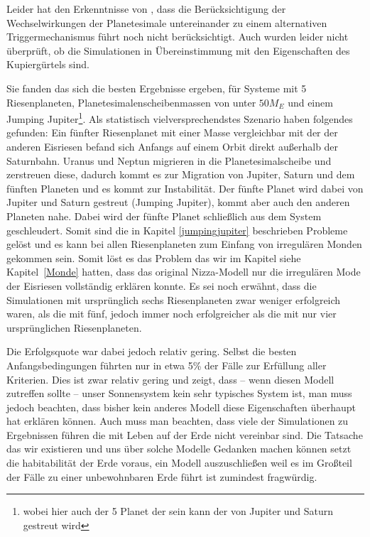 \documentclass[12pt,a4paper,twoside]{article}
\newcommand{\refsec}[1]{siehe Kapitel~\ref{#1}}
\begin{document}
Leider hat \cite{Nesvorny2012} den Erkenntnisse von \cite{Levison2011}, dass die Berücksichtigung der Wechselwirkungen der Planetesimale untereinander zu einem alternativen Triggermechanismus führt noch nicht berücksichtigt. Auch wurden leider nicht überprüft, ob die Simulationen in Übereinstimmung mit den Eigenschaften des Kupiergürtels sind.

Sie fanden das sich die besten Ergebnisse ergeben, für Systeme mit 5 Riesenplaneten, Planetesimalenscheibenmassen von unter $50M_E$ und einem Jumping Jupiter\footnote{wobei hier auch der 5 Planet der sein kann der von Jupiter und Saturn gestreut wird}.
Als statistisch vielversprechendstes Szenario haben \cite{Nesvorny2012} folgendes gefunden:
Ein fünfter Riesenplanet mit einer Masse vergleichbar mit der der anderen Eisriesen befand sich Anfangs auf einem Orbit direkt außerhalb der Saturnbahn.
Uranus und Neptun migrieren in die Planetesimalscheibe und zerstreuen diese, dadurch kommt es zur Migration von Jupiter, Saturn und dem fünften Planeten und es kommt zur Instabilität. Der fünfte Planet wird dabei von Jupiter und Saturn gestreut (Jumping Jupiter), kommt aber auch den anderen Planeten nahe. Dabei wird der fünfte Planet schließlich aus dem System geschleudert. %
Somit sind die in Kapitel \ref{jumpingjupiter} beschrieben Probleme gelöst und es kann bei allen Riesenplaneten zum Einfang von irregulären Monden gekommen sein. Somit löst es das Problem das wir im Kapitel \refsec{Monde} hatten, dass das original Nizza-Modell nur die irregulären Mode der Eisriesen vollständig erklären konnte.
Es sei noch erwähnt, dass die Simulationen mit ursprünglich sechs Riesenplaneten zwar weniger erfolgreich waren, als die mit fünf, jedoch immer noch erfolgreicher als die mit nur vier ursprünglichen Riesenplaneten.

Die Erfolgsquote war dabei jedoch relativ gering. Selbst die besten Anfangsbedingungen führten nur in etwa 5\% der Fälle zur Erfüllung aller Kriterien\cite{Nesvorny2012}. Dies ist zwar relativ gering und zeigt, dass -- wenn diesen Modell zutreffen sollte -- unser Sonnensystem kein sehr typisches System ist, man muss jedoch beachten, dass bisher kein anderes Modell diese Eigenschaften überhaupt hat erklären können.
Auch muss man beachten, dass viele der Simulationen zu Ergebnissen führen die mit Leben auf der Erde nicht vereinbar sind. Die Tatsache das wir existieren und uns über solche Modelle Gedanken machen können setzt die habitabilität der Erde voraus, ein Modell auszuschließen weil es im Großteil der Fälle zu einer unbewohnbaren Erde führt ist zumindest fragwürdig\cite{Brasser2009}.
\end{document}
